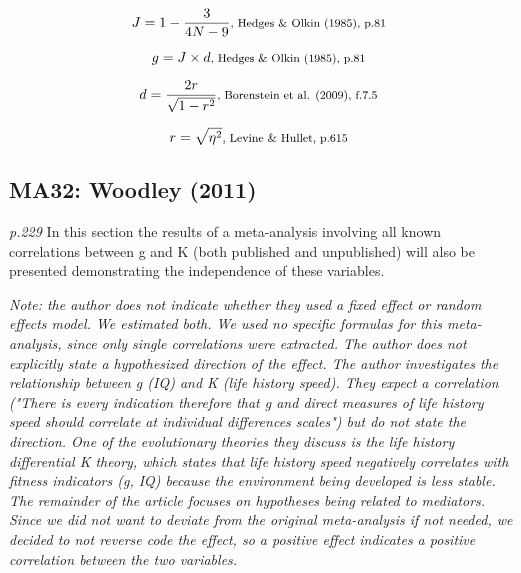 \documentclass{article}
\begin{document}
\begin{equation*}
J={1-{\frac {3}{4N-9}}} \mbox{\footnotesize, Hedges \& Olkin (1985), p.81 }
\end{equation*} 

\begin{equation*}
g=J \times d \mbox{\footnotesize, Hedges \& Olkin (1985), p.81 } 
\end{equation*}

\begin{equation*}
d = {\frac {2 r}{\sqrt {1 - r^{2}}}} \mbox{\footnotesize, Borenstein et al. (2009), f.7.5 } 
\end{equation*}

\begin{equation*}
r = \sqrt {\eta^{2}} \mbox{\footnotesize, Levine \& Hullet, p.615 } 
\end{equation*}

\subsection*{MA32: Woodley (2011)}

\textit{p.229} In this section the results of a meta-analysis involving all known correlations between g and K (both published and unpublished) will also be presented demonstrating the independence of these variables.

\vspace{3 mm}
\textit{Note: the author does not indicate whether they used a fixed effect or random effects model. We estimated both. We used no specific formulas for this meta-analysis, since only single correlations were extracted. The author does not explicitly state a hypothesized direction of the effect. The author investigates the relationship between g (IQ) and K (life history speed). They expect a correlation ("There is every indication therefore that g and direct measures of life history speed should correlate at individual differences scales") but do not state the direction. One of the evolutionary theories they discuss is the life history differential K theory, which states that life history speed negatively correlates with fitness indicators (g, IQ) because the environment being developed is less stable. The remainder of the article focuses on hypotheses being related to mediators. Since we did not want to deviate from the original meta-analysis if not needed, we decided to not reverse code the effect, so a positive effect indicates a positive correlation between the two variables. }
\end{document}
